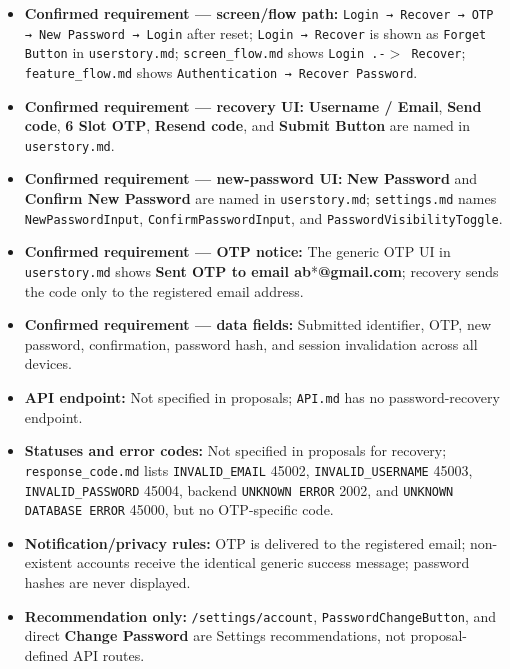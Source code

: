 \documentclass[12pt]{article}
\begin{document}
\begin{itemize}
\item \textbf{Confirmed requirement --- screen/flow path:} \texttt{Login → Recover → OTP → New Password → Login} after reset; \texttt{Login → Recover} is shown as \texttt{Forget Button} in \texttt{userstory.md}; \texttt{screen\_flow.md} shows \texttt{Login .-$>$ Recover}; \texttt{feature\_flow.md} shows \texttt{Authentication → Recover Password}.
\item \textbf{Confirmed requirement --- recovery UI:} \textbf{Username / Email}, \textbf{Send code}, \textbf{6 Slot OTP}, \textbf{Resend code}, and \textbf{Submit Button} are named in \texttt{userstory.md}.
\item \textbf{Confirmed requirement --- new-password UI:} \textbf{New Password} and \textbf{Confirm New Password} are named in \texttt{userstory.md}; \texttt{settings.md} names \texttt{NewPasswordInput}, \texttt{ConfirmPasswordInput}, and \texttt{PasswordVisibilityToggle}.
\item \textbf{Confirmed requirement --- OTP notice:} The generic OTP UI in \texttt{userstory.md} shows \textbf{Sent OTP to email ab}*\textbf{@gmail.com}; recovery sends the code only to the registered email address.
\item \textbf{Confirmed requirement --- data fields:} Submitted identifier, OTP, new password, confirmation, password hash, and session invalidation across all devices.
\item \textbf{API endpoint:} Not specified in proposals; \texttt{API.md} has no password-recovery endpoint.
\item \textbf{Statuses and error codes:} Not specified in proposals for recovery; \texttt{response\_code.md} lists \texttt{INVALID\_EMAIL} 45002, \texttt{INVALID\_USERNAME} 45003, \texttt{INVALID\_PASSWORD} 45004, backend \texttt{UNKNOWN ERROR} 2002, and \texttt{UNKNOWN DATABASE ERROR} 45000, but no OTP-specific code.
\item \textbf{Notification/privacy rules:} OTP is delivered to the registered email; non-existent accounts receive the identical generic success message; password hashes are never displayed.
\item \textbf{Recommendation only:} \texttt{/settings/account}, \texttt{PasswordChangeButton}, and direct \textbf{Change Password} are Settings recommendations, not proposal-defined API routes.
\end{itemize}
\par\medskip

\hypertarget{sec:b11-source-alignment-notes}{}
\end{document}

